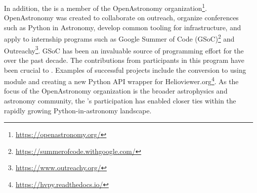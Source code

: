 In addition, the \sunpyproj is a member of the OpenAstronomy organization\footnote{\url{https://openastronomy.org/}}.
OpenAstronomy was created to collaborate on outreach, organize conferences such as Python in Astronomy, develop common tooling for infrastructure, and apply to internship programs such as Google Summer of Code (GSoC)\footnote{\url{https://summerofcode.withgoogle.com/}} and Outreachy\footnote{\url{https://www.outreachy.org/}}.
GSoC has been an invaluable source of programming effort for the \sunpyproj over the past decade.
The contributions from participants in this program have been crucial to \sunpypkg.
Examples of successful projects include the conversion to using  module and creating a new Python API wrapper for Helioviewer.org\footnote{\url{https://hvpy.readthedocs.io/}}.
As the focus of the OpenAstronomy organization is the broader astrophysics and astronomy community, the \sunpyproj's participation has enabled closer ties within the rapidly growing  Python-in-astronomy landscape.
